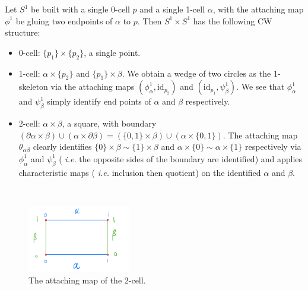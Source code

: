 \documentclass[12pt]{article}
\begin{document}
\begin{problem}[7]
Let $ S^{1}$ be built with a single 0-cell $ p$ and a single 1-cell $ \alpha$, with the attaching map $ \phi^{1}$ be gluing two endpoints of $ \alpha$ to $ p$. Then $ S^{1} \times S^{1}$ has the following CW structure:
\begin{itemize}
	\item 0-cell: $ \{p_1\} \times \{p_2\}$, a single point.
	\item 1-cell: $ \alpha \times \{p_2\} $ and $ \{p_1\} \times \beta$. We obtain a wedge of two circles as the 1-skeleton via the attaching maps $ (\phi_{ \alpha}^{1}, \text{id}_{ p_2}) $ and $ (\text{id}_{ p_1}, \psi_{ \beta}^{1})$. We see that $ \phi_{ \alpha}^{1}$ and $ \psi_{ \beta}^{1}$ simply identify end points of $ \alpha$ and $ \beta$ respectively.
	\item 2-cell: $ \alpha \times \beta$, a square, with boundary $ (\partial \alpha \times \beta) \cup (\alpha\times  \partial \beta) = (\{0,1\} \times \beta ) \cup ( \alpha \times \{0,1\} )$. The attaching map $ \theta_{ \alpha \beta}$ clearly identifies $\{0\} \times \beta \sim \{1\} \times \beta $ and $ \alpha \times \{0\} \sim \alpha \times \{1\} $ respectively via $ \phi_{ \alpha}^{1}$ and $ \psi_{ \beta}^{1}$ ( \emph{i.e.} the opposite sides of the boundary are identified) and applies characteristic maps ( \emph{i.e.} inclusion then quotient) on the identified $ \alpha$ and $ \beta$.
\end{itemize}
~\begin{figure}[H]
	\centering
	\includegraphics[width=0.4\textwidth]{./figures/torus_cw.png}
	\caption{The attaching map of the 2-cell.}
\end{figure}
\end{problem}
\end{document}
